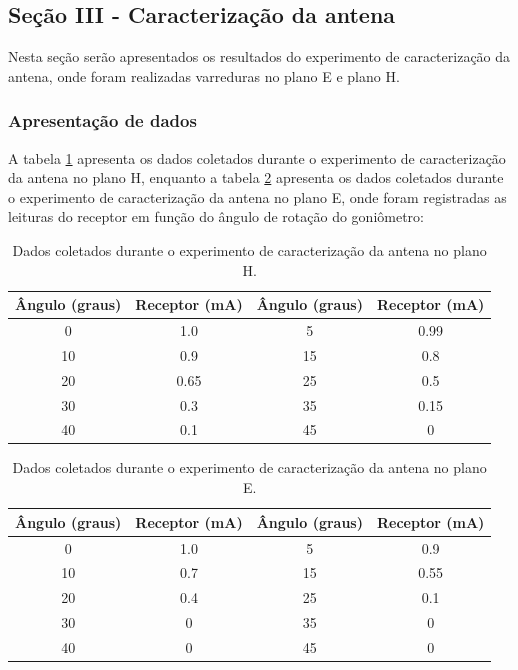 \documentclass[12pt]{article}
\begin{document}
\subsection{Seção III - Caracterização da antena}
Nesta seção serão apresentados os resultados do experimento de
caracterização da antena, onde foram realizadas varreduras no plano E e plano H.
\subsubsection{Apresentação de dados}
A tabela \ref{tab:caracterizacaoantenaplanoh} apresenta os dados coletados
durante o experimento de caracterização da antena no plano H, enquanto a tabela
\ref{tab:caracterizacaoantenaplanoe} apresenta os dados coletados
durante o experimento de caracterização da antena no plano E,
onde foram registradas as leituras do receptor em função do ângulo de
rotação do goniômetro:

\begin{table}[H]
  \centering
  \begin{tabular}{|c|c|c|c|}
    \hline
    Ângulo (graus) & Receptor (mA) & Ângulo (graus) & Receptor (mA)\\
    \hline
    0 & 1.0 & 5 & 0.99 \\
    10 & 0.9 & 15 & 0.8 \\
    20 & 0.65 & 25 & 0.5 \\
    30 & 0.3 & 35 & 0.15 \\
    40 & 0.1 & 45 & 0 \\
    \hline
  \end{tabular}
  \caption{Dados coletados durante o experimento de caracterização da
  antena no plano H.}
  \label{tab:caracterizacaoantenaplanoh}
\end{table}

\begin{table}[H]
  \centering
  \begin{tabular}{|c|c|c|c|}
    \hline
    Ângulo (graus) & Receptor (mA) & Ângulo (graus) & Receptor (mA)\\
    \hline
    0 & 1.0 & 5 & 0.9 \\
    10 & 0.7 & 15 & 0.55 \\
    20 & 0.4 & 25 & 0.1 \\
    30 & 0 & 35 & 0 \\
    40 & 0 & 45 & 0 \\
    \hline
  \end{tabular}
  \caption{Dados coletados durante o experimento de caracterização da
  antena no plano E.}
  \label{tab:caracterizacaoantenaplanoe}
\end{table}
\end{document}
